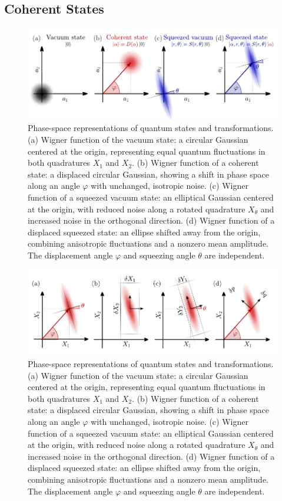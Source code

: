 \subsection*{Coherent States}


\begin{figure}
\centering
\includegraphics[width=\textwidth]{./chap2/fig/quantumstates (2).pdf}
\caption{Phase-space representations of quantum states and transformations.
(a) Wigner function of the vacuum state: a circular Gaussian centered at the origin, representing equal quantum fluctuations in both quadratures $X_1$ and $X_2$.
(b) Wigner function of a coherent state: a displaced circular Gaussian, showing a shift in phase space along an angle $\varphi$ with unchanged, isotropic noise.
(c) Wigner function of a squeezed vacuum state: an elliptical Gaussian centered at the origin, with reduced noise along a rotated quadrature $X_\theta$ and increased noise in the orthogonal direction.
(d) Wigner function of a displaced squeezed state: an ellipse shifted away from the origin, combining anisotropic fluctuations and a nonzero mean amplitude. The displacement angle $\varphi$ and squeezing angle $\theta$ are independent.} 
\end{figure}

\begin{figure}
\centering
\includegraphics[width=\textwidth]{./chap2/fig/quadratures_phasespace.pdf}
\caption{Phase-space representations of quantum states and transformations.
(a) Wigner function of the vacuum state: a circular Gaussian centered at the origin, representing equal quantum fluctuations in both quadratures $X_1$ and $X_2$.
(b) Wigner function of a coherent state: a displaced circular Gaussian, showing a shift in phase space along an angle $\varphi$ with unchanged, isotropic noise.
(c) Wigner function of a squeezed vacuum state: an elliptical Gaussian centered at the origin, with reduced noise along a rotated quadrature $X_\theta$ and increased noise in the orthogonal direction.
(d) Wigner function of a displaced squeezed state: an ellipse shifted away from the origin, combining anisotropic fluctuations and a nonzero mean amplitude. The displacement angle $\varphi$ and squeezing angle $\theta$ are independent.} 
\end{figure}


